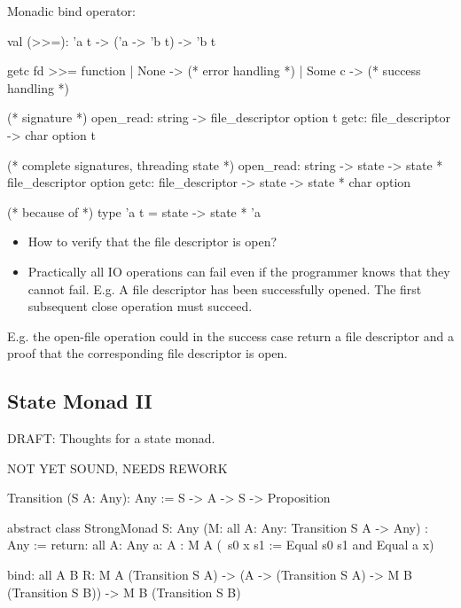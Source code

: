 \noindent Monadic bind operator:
\begin{ocaml}
  val (>>=): 'a t -> ('a -> 'b t) -> 'b t
\end{ocaml}


\begin{ocaml}
  getc fd >>= function
  | None ->
    (* error handling *)
  | Some c ->
    (* success handling *)

  (* signature *)
  open_read: string -> file_descriptor option t
  getc: file_descriptor -> char option t

  (* complete signatures, threading state *)
  open_read: string -> state -> state * file_descriptor option
  getc: file_descriptor -> state -> state * char option

  (* because of *)
  type 'a t = state -> state * 'a
\end{ocaml}
%

\begin{itemize}
\item How to verify that the file descriptor is open?


\item Practically all IO operations can fail even if the programmer knows that
  they cannot fail. E.g. A file descriptor has been successfully opened. The
  first subsequent close operation must succeed.

\end{itemize}


E.g. the open-file operation could in the success case return a file
descriptor and a proof that the corresponding file descriptor is open.







\subsection{State Monad II}


\noindent DRAFT: Thoughts for a state monad.

NOT YET SOUND, NEEDS REWORK


\begin{alba}
    Transition (S A: Any): Any :=
        S -> A -> S -> Proposition


    abstract class
        StrongMonad
            {S: Any}
            (M: all {A: Any}: Transition S A -> Any)
            : Any
    :=
        return:
            all
                {A: Any}
                {a: A}
                : M A (\ s0 x s1 := Equal s0 s1 and Equal a x)

        bind:
            all {A B R}:
                M A (Transition S A)
                -> (A -> (Transition S A) -> M B (Transition S B))
                -> M B (Transition S B)
\end{alba}







